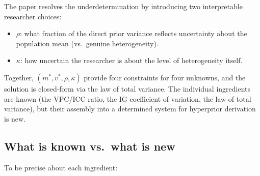\documentclass[12pt,a4paper]{article}
\begin{document}
The paper resolves the underdetermination by introducing two interpretable
researcher choices:
\begin{itemize}
  \item $\rho$: what fraction of the direct prior variance reflects uncertainty
    about the population mean (vs.\ genuine heterogeneity).
  \item $\kappa$: how uncertain the researcher is about the level of
    heterogeneity itself.
\end{itemize}
Together, $(m^*, v^*, \rho, \kappa)$ provide four constraints for four unknowns,
and the solution is closed-form via the law of total variance. The individual
ingredients are known (the VPC/ICC ratio, the IG coefficient of variation, the
law of total variance), but their assembly into a determined system for
hyperprior derivation is new.

\subsection{What is known vs.\ what is new}

To be precise about each ingredient:
\end{document}
